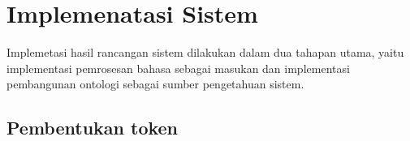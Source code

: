 \section{Implemenatasi Sistem}
Implemetasi hasil rancangan sistem dilakukan dalam dua tahapan utama, yaitu implementasi pemrosesan bahasa sebagai masukan dan implementasi pembangunan ontologi sebagai sumber pengetahuan sistem.

\subsection{Pembentukan token}
